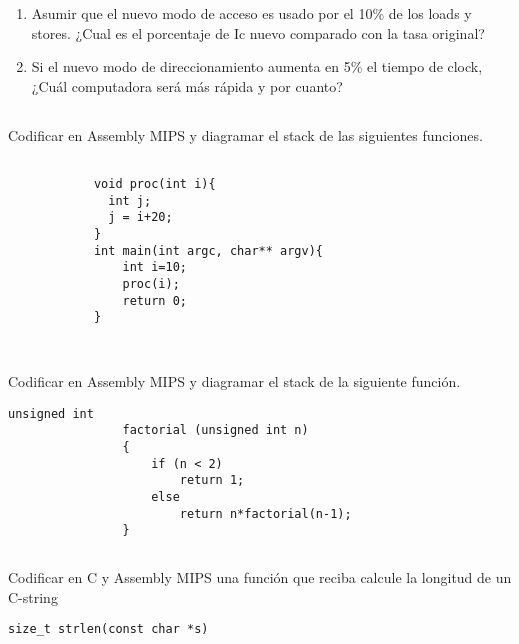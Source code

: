 			\begin{enumerate}[label=\alph*)]
			 \item Asumir que el nuevo modo de acceso es usado por el 10\% de los loads y stores. ¿Cual es el porcentaje de Ic nuevo comparado con la tasa original?
            \item Si el nuevo modo de direccionamiento aumenta en 5\% el tiempo de clock, ¿Cuál
			       computadora será más rápida y por cuanto?
			\end{enumerate}

\subsection{}
  Codificar en Assembly MIPS y diagramar el stack de las siguientes funciones.
	\begin{small}
			\begin{lstlisting}[style=6620C]
			
			void proc(int i){
			  int j;
			  j = i+20; 
			} 
			int main(int argc, char** argv){
			    int i=10; 
			    proc(i); 
			    return 0; 
			} 
			
	\end{lstlisting}
  \end{small}

\subsection{}
  Codificar en Assembly MIPS y diagramar el stack de la siguiente función.
		\begin{small}
			\begin{lstlisting}[style=6620C]
				unsigned int
				factorial (unsigned int n)
				{
				    if (n < 2)
				        return 1;
				    else 
				        return n*factorial(n-1);
				}
			\end{lstlisting}
		\end{small}

\subsection{}
  Codificar en C  y Assembly MIPS una función que reciba calcule la longitud de un C-string\\
  \begin{lstlisting}[style=6620C]
  size_t strlen(const char *s)
  \end{lstlisting}
